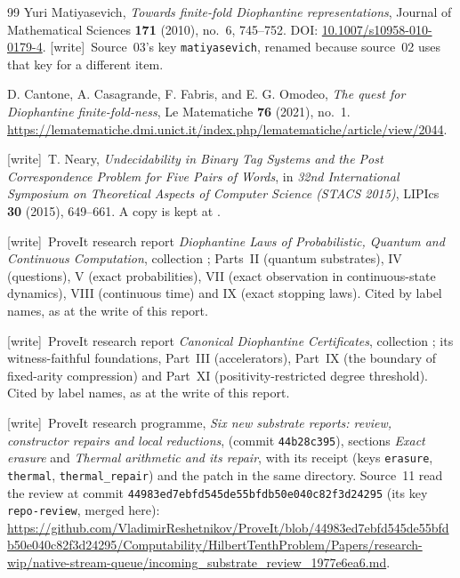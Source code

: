 \documentclass[11pt,letterpaper]{article}
\theoremstyle{definition}
\theoremstyle{remark}
\newcommand{\wtag}{\textup{[write]}}
\begin{document}
\begin{thebibliography}{99}
Yuri Matiyasevich,
\emph{Towards finite-fold Diophantine representations},
Journal of Mathematical Sciences \textbf{171} (2010), no.~6, 745--752.
DOI: \href{https://doi.org/10.1007/s10958-010-0179-4}{10.1007/s10958-010-0179-4}.
\wtag\ Source~03's key \texttt{matiyasevich}, renamed because source~02 uses that key for a different item.

D. Cantone, A. Casagrande, F. Fabris, and E. G. Omodeo,
\emph{The quest for Diophantine finite-fold-ness},
Le Matematiche \textbf{76} (2021), no.~1.
\url{https://lematematiche.dmi.unict.it/index.php/lematematiche/article/view/2044}.

\wtag\ T. Neary,
\emph{Undecidability in Binary Tag Systems and the Post Correspondence Problem for Five Pairs of Words},
in \emph{32nd International Symposium on Theoretical Aspects of Computer Science (STACS 2015)},
LIPIcs \textbf{30} (2015), 649--661. A copy is kept at .

\wtag\ ProveIt research report \emph{Diophantine Laws of Probabilistic, Quantum and Continuous Computation}, collection ; Parts~II (quantum substrates), IV (questions), V (exact probabilities), VII (exact observation in continuous-state dynamics), VIII (continuous time) and IX (exact stopping laws). Cited by label names, as at the write of this report.

\wtag\ ProveIt research report \emph{Canonical Diophantine Certificates}, collection ; its witness-faithful foundations, Part~III (accelerators), Part~IX (the boundary of fixed-arity compression) and Part~XI (positivity-restricted degree threshold). Cited by label names, as at the write of this report.

\wtag\ ProveIt research programme, \emph{Six new substrate reports: review, constructor repairs and local reductions},  (commit \texttt{44b28c395}), sections \emph{Exact erasure} and \emph{Thermal arithmetic and its repair}, with its receipt  (keys \texttt{erasure}, \texttt{thermal}, \texttt{thermal\_repair}) and the patch  in the same directory. Source~11 read the review at commit \texttt{44983ed7ebfd545de55bfdb50e040c82f3d24295} (its key \texttt{repo-review}, merged here): \url{https://github.com/VladimirReshetnikov/ProveIt/blob/44983ed7ebfd545de55bfdb50e040c82f3d24295/Computability/HilbertTenthProblem/Papers/research-wip/native-stream-queue/incoming_substrate_review_1977e6ea6.md}.


\end{thebibliography}
\end{document}
